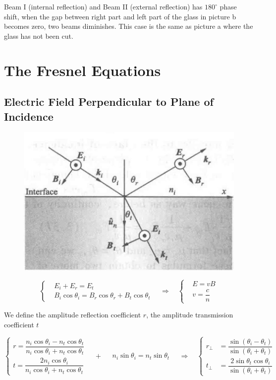 Beam I (internal reflection) and Beam II (external reflection) has $180^{\circ}$ phase shift, when the gap between right part and left part of the glass in picture b becomes zero, two beams diminishes. This case is the same as picture a where the glass has not been cut.

\section{The Fresnel Equations}

\subsection{Electric Field Perpendicular to Plane of Incidence}

\begin{figure}[H]
  \centering
  \includegraphics[width=0.4\linewidth]{figures/Fresnel-perpendicular}
\end{figure}

\begin{equation*}
 \left\{
  \begin{aligned}
    & E_i + E_r = E_t \\
    & B_i \cos \theta_i = B_r \cos \theta_r + B_t \cos \theta_t
  \end{aligned}
  \right.
  \quad \Rightarrow \quad
  \left\{
  \begin{aligned}
    & E = v B \\
    & v = \dfrac{c}{n}
  \end{aligned}
  \right.
\end{equation*}

We define the amplitude reflection coefficient $r$, the amplitude transmission coefficient $t$

\begin{equation*}
  \left\{
  \begin{aligned}
    r = \dfrac{n_i \cos \theta_i - n_t \cos \theta_t}{n_i \cos \theta_i + n_t \cos \theta_t} \\
    t = \dfrac{2 n_i \cos \theta_i}{n_i \cos \theta_i + n_t \cos \theta_t} 
  \end{aligned}
  \right.
  \quad + \quad
  \begin{aligned}
    n_i \sin \theta_i = n_t \sin \theta_t
  \end{aligned}
  \quad \Rightarrow \quad
  \left\{
  \begin{aligned}
    r_{\perp} &= \dfrac{\sin \left( \theta_i - \theta_t \right)}{\sin \left( \theta_i + \theta_t \right)} \\
    t_{\perp} &= \dfrac{2 \sin \theta_t \cos \theta_i}{\sin \left( \theta_i + \theta_t \right)} 
  \end{aligned}
  \right.
\end{equation*}

